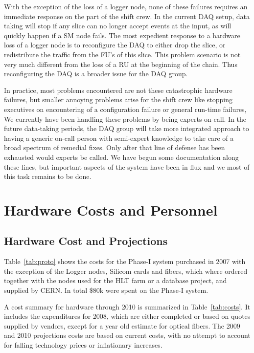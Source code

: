 With the exception of the loss of a logger node, none of these failures
requires an immediate response on the part of the shift crew.
In the current DAQ setup, data taking will stop if any slice can no longer
accept events at the input, as will quickly happen if a SM node fails.
The most expedient response to a hardware loss of a logger node is
to reconfigure the DAQ to either drop the slice, 
or redistribute the traffic from the FU's of this slice.
This problem scenario is not very much different from the loss of a RU
at the beginning of the chain.
Thus reconfiguring the DAQ is a broader issue for the DAQ group.


In practice, most problems encountered are not these catastrophic hardware failures,
but smaller annoying problems arise for the shift crew like stopping executives on 
encountering of a configuration failure or general run-time failures,
We currently have been handling these problems by being experts-on-call.
In the future data-taking periods, the DAQ group will take more integrated
approach to having a generic on-call person with semi-expert knowledge to take 
care of a broad spectrum of remedial fixes.
Only after that line of defense has been exhausted would experts be called.
We have begun some documentation along these lines, but important
aspects of the system have been in flux and we most of this task
remains to be done.

\newpage

\appendix

\section{Hardware Costs and Personnel}


\subsection{Hardware Cost and Projections}
Table~\ref{tab:proto} shows the costs for the Phase-I  system purchased in 2007 
with the exception of the Logger nodes, Silicom cards and fibers, 
which where ordered together with the nodes used for the HLT farm or a database project,
and supplied by CERN. 
In total \$80k were spent on the Phase-I  system. 

A cost summary for hardware through 2010 is summarized in  Table~\ref{tab:costs}.
It includes the expenditures for 2008, which are either completed
or based on quotes supplied by vendors, except for a year old estimate 
for optical fibers.
The 2009 and 2010 projections costs are based on current costs,
with no attempt to account for falling technology prices or inflationary increases.


